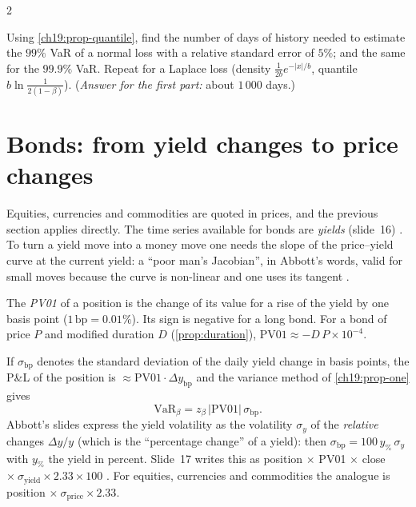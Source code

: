 \begin{paracol}{2}
\begin{exercise}
Using \cref{ch19:prop-quantile}, find the number of days of history needed to estimate the $99\%$ VaR of a normal loss with a relative standard error of $5\%$; and the same for the $99.9\%$ VaR. Repeat for a Laplace loss (density $\frac1{2b}e^{-|x|/b}$, quantile $b\ln\frac1{2(1-\beta)}$). (\emph{Answer for the first part:} about $1\,000$ days.)
\end{exercise}

\section{Bonds: from yield changes to price changes}\label{ch19:sec-fi}
Equities, currencies and commodities are quoted in prices, and the previous section applies directly. The time series available for bonds are \emph{yields} (slide~16) . To turn a yield move into a money move one needs the slope of the price--yield curve at the current yield: a ``poor man's Jacobian'', in Abbott's words, valid for small moves because the curve is non-linear and one uses its tangent .

\begin{definition}[PV01 (DV01, PVBP)]
The \emph{PV01} of a position is the change of its value for a rise of the yield by one basis point ($1\,\mathrm{bp}=0.01\%$). Its sign is negative for a long bond. For a bond of price $P$ and modified duration $D$ (\cref{prop:duration}), $\mathrm{PV01}\approx-D\,P\times10^{-4}$.
\end{definition}
If $\sigma_{\mathrm{bp}}$ denotes the standard deviation of the daily yield change in basis points, the P\&L of the position is $\approx\mathrm{PV01}\cdot\Delta y_{\mathrm{bp}}$ and the variance method of \cref{ch19:prop-one} gives
\begin{equation}\label{ch19:eq-fi}
  \mathrm{VaR}_\beta=z_\beta\,\bigl|\mathrm{PV01}\bigr|\,\sigma_{\mathrm{bp}} .
\end{equation}
Abbott's slides express the yield volatility as the volatility $\sigma_y$ of the \emph{relative} changes $\Delta y/y$ (which is the ``percentage change'' of a yield): then $\sigma_{\mathrm{bp}}=100\,y_{\%}\,\sigma_y$ with $y_\%$ the yield in percent. Slide~17 writes this as position $\times$ PV01 $\times$ close $\times\ \sigma_{\mathrm{yield}}\times2.33\times100$ . For equities, currencies and commodities the analogue is position $\times\ \sigma_{\mathrm{price}}\times2.33$.


\end{paracol}
